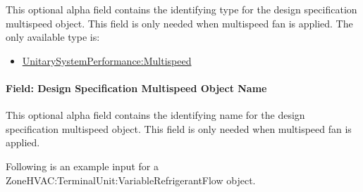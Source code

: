 This optional alpha field contains the identifying type for the design specification multispeed object. This field is only needed when multispeed fan is applied. The only available type is:

\begin{itemize}
\tightlist
\item
  \hyperref[unitarysystemperformancemultispeed]{UnitarySystemPerformance:Multispeed}
\end{itemize}

\paragraph{Field: Design Specification Multispeed Object Name}\label{field-design-specification-multispeed-object-name-3}

This optional alpha field contains the identifying name for the design specification multispeed object. This field is only needed when multispeed fan is applied.


Following is an example input for a ZoneHVAC:TerminalUnit:VariableRefrigerantFlow object.

